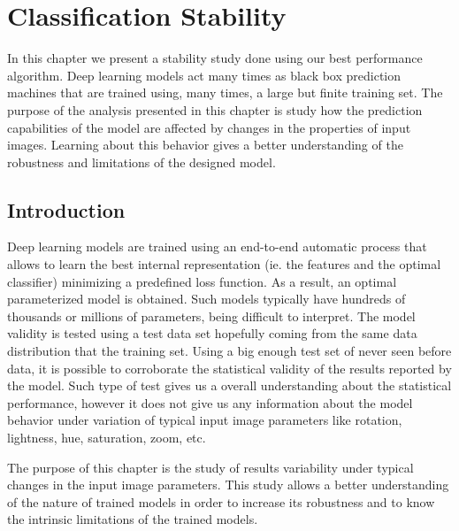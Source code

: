
\chapter{Classification Stability} %

\label{Chapter:Stability} %


In this chapter we present a stability study done using our best performance algorithm. Deep learning models act many times as black box prediction machines that are trained using, many times, a large but finite training set. The purpose of the analysis presented in this chapter is study how the prediction capabilities of the model are affected by changes in the properties of input images. Learning about this behavior gives a better understanding of the robustness and limitations of the designed model.

\section{Introduction}

Deep learning models are trained using an end-to-end automatic process that allows to learn the best internal representation (ie. the features and the optimal classifier) minimizing a predefined loss function. As a result, an optimal parameterized model is obtained. Such models typically have hundreds of thousands or millions of parameters, being difficult to interpret. The model validity is tested using a test data set hopefully coming from the same data distribution that the training set. Using a big enough test set of never seen before data, it is possible to corroborate the statistical validity of the results reported by the model. Such type of test gives us a overall understanding about the statistical performance, however it does not give us any information about the model behavior under variation of typical input image parameters like rotation, lightness, hue, saturation, zoom, etc. 

The purpose of this chapter is the study of results variability under typical changes in the input image parameters. This study allows a better understanding of the nature of trained models in order to increase its robustness and to know the intrinsic limitations of the trained models.

